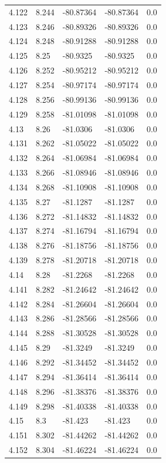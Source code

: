 \begin{tabular}{lllll}
4.122 & 8.244 & -80.87364 & -80.87364 & 0.0 \\
4.123 & 8.246 & -80.89326 & -80.89326 & 0.0 \\
4.124 & 8.248 & -80.91288 & -80.91288 & 0.0 \\
4.125 & 8.25 & -80.9325 & -80.9325 & 0.0 \\
4.126 & 8.252 & -80.95212 & -80.95212 & 0.0 \\
4.127 & 8.254 & -80.97174 & -80.97174 & 0.0 \\
4.128 & 8.256 & -80.99136 & -80.99136 & 0.0 \\
4.129 & 8.258 & -81.01098 & -81.01098 & 0.0 \\
4.13 & 8.26 & -81.0306 & -81.0306 & 0.0 \\
4.131 & 8.262 & -81.05022 & -81.05022 & 0.0 \\
4.132 & 8.264 & -81.06984 & -81.06984 & 0.0 \\
4.133 & 8.266 & -81.08946 & -81.08946 & 0.0 \\
4.134 & 8.268 & -81.10908 & -81.10908 & 0.0 \\
4.135 & 8.27 & -81.1287 & -81.1287 & 0.0 \\
4.136 & 8.272 & -81.14832 & -81.14832 & 0.0 \\
4.137 & 8.274 & -81.16794 & -81.16794 & 0.0 \\
4.138 & 8.276 & -81.18756 & -81.18756 & 0.0 \\
4.139 & 8.278 & -81.20718 & -81.20718 & 0.0 \\
4.14 & 8.28 & -81.2268 & -81.2268 & 0.0 \\
4.141 & 8.282 & -81.24642 & -81.24642 & 0.0 \\
4.142 & 8.284 & -81.26604 & -81.26604 & 0.0 \\
4.143 & 8.286 & -81.28566 & -81.28566 & 0.0 \\
4.144 & 8.288 & -81.30528 & -81.30528 & 0.0 \\
4.145 & 8.29 & -81.3249 & -81.3249 & 0.0 \\
4.146 & 8.292 & -81.34452 & -81.34452 & 0.0 \\
4.147 & 8.294 & -81.36414 & -81.36414 & 0.0 \\
4.148 & 8.296 & -81.38376 & -81.38376 & 0.0 \\
4.149 & 8.298 & -81.40338 & -81.40338 & 0.0 \\
4.15 & 8.3 & -81.423 & -81.423 & 0.0 \\
4.151 & 8.302 & -81.44262 & -81.44262 & 0.0 \\
4.152 & 8.304 & -81.46224 & -81.46224 & 0.0 \\

\end{tabular}
